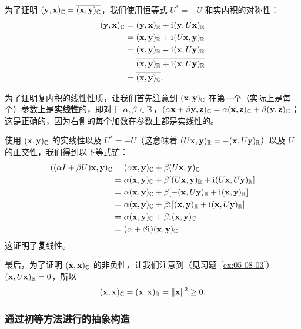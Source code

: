 为了证明 $(\yy, \xx)_{\CC} = \overline{(\xx, \yy)_{\CC}}$，我们使用恒等式 $U^* = -U$ 和实内积的对称性：
\begin{equation} \notag
\begin{split}
(\yy, \xx)_{\CC} =&\   (\yy, \xx)_{\RR} + \ii(\yy, U\xx)_{\RR} \\
=&\ (\xx, \yy)_{\RR} + \ii(U\xx, \yy)_{\RR}   \\
=&\ (\xx, \yy)_{\RR} - \ii(\xx, U\yy)_{\RR}   \\
=&\ \overline{(\xx, \yy)_{\RR} + \ii(\xx, U\yy)_{\RR} } \\
=&\ \overline{ (\xx, \yy)_{\CC}}.
\end{split}
\end{equation}

为了证明复内积的线性性质，让我们首先注意到 $(\xx, \yy)_{\CC}$ 在第一个（实际上是每个）参数上是\textbf{实线性}的，即对于 $\alpha, \beta \in \RR$，$( \alpha \xx + \beta \yy, \zz )_{\CC} = \alpha (\xx, \zz)_{\CC} + \beta (\yy, \zz)_{\CC}$；这是正确的，因为右侧的每个加数在参数上都是实线性的。

使用 $(\xx, \yy)_{\CC}$ 的实线性以及 $U^* = -U$（这意味着 $(U\xx, \yy)_{\RR} = -(\xx, U\yy)_{\RR}$）以及 $U$ 的正交性，我们得到以下等式链：
\begin{equation} \notag
\begin{split}
((\alpha I + \beta U)\xx, \yy)_{\CC} =&\      (\alpha \xx, \yy)_{\CC} + \beta (U\xx, \yy)_{\CC}  \\
=&\  \alpha (\xx, \yy)_{\CC} + \beta [(U\xx, \yy)_{\RR} + \ii(U\xx, U\yy)_{\RR}] \\
=&\ \alpha (\xx, \yy)_{\CC} + \beta [-(\xx, U\yy)_{\RR} + \ii(\xx, \yy)_{\RR}]   \\
=&\ \alpha (\xx, \yy)_{\CC} + \beta \ii [(\xx, \yy)_{\RR} + \ii(\xx, U\yy)_{\RR}]   \\
=&\ \alpha (\xx, \yy)_{\CC} + \beta \ii (\xx, \yy)_{\CC}  \\
=&\ (\alpha + \beta \ii)(\xx, \yy)_{\CC}  .
\end{split}
\end{equation}
这证明了\textbf{复}线性。

最后，为了证明 $(\xx, \xx)_{\CC}$ 的非负性，让我们注意到（见习题~\ref{ex:05-08-03}）$(\xx, U\xx)_{\RR} = 0$，所以
$$(\xx, \xx)_{\CC} = (\xx, \xx)_{\RR} = \|\xx\|^2 \geq 0.$$

\subsubsection{通过初等方法进行的抽象构造}\label{sec:05-08-03-04}

